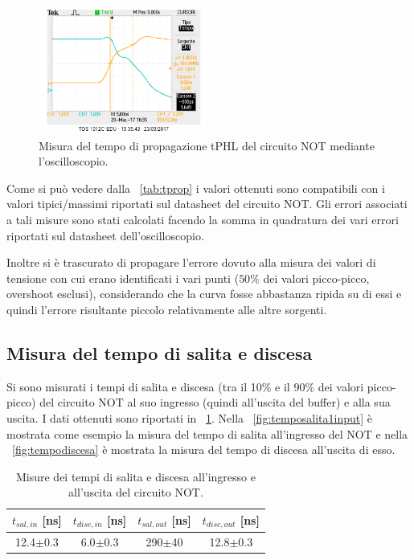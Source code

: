 \documentclass[a4paper,10pt]{article}
\begin{document}
{\begin{figure}[H]
	\centering
	\includegraphics[width=0.5\textwidth]{../grafici/tphlNOT.png}
	\caption{Misura del tempo di propagazione tPHL del circuito NOT mediante l'oscilloscopio.}
	\label{fig:tphlNOT}
\end{figure}

Come si può vedere dalla \tablename{~\ref{tab:tprop}} i valori ottenuti sono compatibili con i valori tipici/massimi riportati sul datasheet del circuito NOT. Gli errori associati a tali misure sono stati calcolati facendo la somma in quadratura dei vari errori riportati sul datasheet dell'oscilloscopio.

Inoltre si è trascurato di propagare l'errore dovuto alla misura dei valori di tensione con cui erano identificati i vari punti ($50\%$ dei valori picco-picco, overshoot esclusi), considerando che la curva fosse abbastanza ripida su di essi e quindi l'errore risultante piccolo relativamente alle altre sorgenti.

\subsection{Misura del tempo di salita e discesa}
Si sono misurati i tempi di salita e discesa (tra il 10\% e il 90\% dei valori picco-picco) del circuito NOT al suo ingresso (quindi all'uscita del buffer) e alla sua uscita. I dati ottenuti sono riportati in \tablename{~\ref{tab:tsaldisc}}. Nella \figurename{~\ref{fig:temposalita1input}} è mostrata come esempio la misura del tempo di salita all'ingresso del NOT e nella \figurename{~\ref{fig:tempodiscesa}} è mostrata la misura del tempo di discesa all'uscita di esso.

\begin{table}[H]
	\centering
	\begin{tabular}{c|c|c|c}
	$t_{sal,in}$ [ns] & $t_{disc,in}$ [ns] & $t_{sal,out}$ [ns] & $t_{disc,out}$ [ns]\\
	\hline
	12.4$\pm$0.3 & 6.0$\pm$0.3 & 290$\pm$40 &12.8$\pm$0.3\\
	\hline
	\end{tabular}
	\caption{Misure dei tempi di salita e discesa all'ingresso e all'uscita del circuito NOT.}
	\label{tab:tsaldisc}
\end{table}


}
\end{document}
